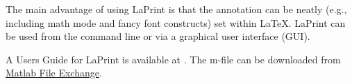         The main advantage of using LaPrint is that the annotation can be neatly (e.g., including math mode and fancy font constructs) set within \LaTeX. LaPrint can be used from the command line or via a graphical user interface (GUI).
        
        A Users Guide for LaPrint is available at \href{http://www.uni-kassel.de/fb16/rat/matlab/laprint/laprintdoc.ps}{}.
        The m-file can be downloaded from \href{http://www.mathworks.de/matlabcentral/fileexchange/4638}{Matlab File Exchange}.
        

        
%         
